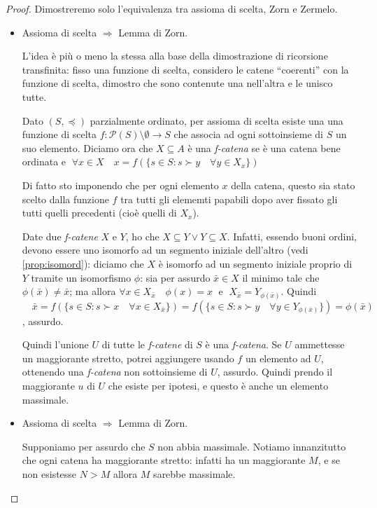 \documentclass[a4paper,10pt,oneside]{article}
\newcommand{\myname}[1]{\emph{#1}}
\theoremstyle{plain}
\theoremstyle{definition}
\theoremstyle{remark}
\begin{document}
\begin{proof}Dimostreremo solo l'equivalenza tra assioma di scelta, Zorn e Zermelo.

\begin{itemize}
 \item Assioma di scelta $\Rightarrow$ Lemma di Zorn.
 
 L'idea è più o meno la stessa alla base della dimostrazione di ricorsione transfinita: fisso una funzione di scelta, considero le catene ``coerenti'' con la funzione di scelta, dimostro che sono contenute una nell'altra e le unisco tutte.
 
 Dato $(S,\preceq)$ parzialmente ordinato, per assioma di scelta esiste una una funzione di scelta $f: \mathcal P (S)\setminus{\emptyset} \rightarrow S$ che associa ad ogni sottoinsieme di $S$ un suo elemento. Diciamo ora che $X\subseteq A$ è una \myname{f-catena} se è una catena bene ordinata e $\; \forall x\in X \quad x=f(\{s\in S: s\succ y \quad \forall y\in X_x\})$
 
 Di fatto sto imponendo che per ogni elemento $x$ della catena, questo sia stato scelto dalla funzione $f$ tra tutti gli elememti papabili dopo aver fissato gli tutti quelli precedenti (cioè quelli di $X_x$).
 
 Date due \myname{f-catene} $X$ e $Y$, ho che $X\subseteq Y \vee Y\subseteq X$. Infatti, essendo buoni ordini, devono essere uno isomorfo ad un segmento iniziale dell'altro (vedi \ref{prop:isomord}): diciamo che $X$ è isomorfo ad un segmento iniziale proprio di $Y$ tramite un isomorfismo $\phi$: sia per assurdo $\bar x\in X$ il minimo tale che $\phi(\bar x)\not = \bar x$; ma allora $\forall x\in X_{\bar x} \quad \phi(x)=x \;$ e $\; X_{\bar x}=Y_{\phi(\bar x)}$. Quindi $\quad\bar x=f(\{s\in S:s\succ x \quad \forall x\in X_{\bar x}\})=f(\{s\in S:s\succ y \quad \forall y\in Y_{\phi(\bar x)}\})=\phi(\bar x)$, assurdo.
 
 Quindi l'unione $U$ di tutte le \myname{f-catene} di $S$ è una \myname{f-catena}. Se $U$ ammettesse un maggiorante stretto, potrei aggiungere usando $f$ un elemento ad $U$, ottenendo una \myname{f-catena} non sottoinsieme di $U$, assurdo. Quindi prendo il maggiorante $u$ di $U$ che esiste per ipotesi, e questo è anche un elemento massimale.
 
 \item Assioma di scelta $\Rightarrow$ Lemma di Zorn.
 
 Supponiamo per assurdo che $S$ non abbia massimale. Notiamo innanzitutto che ogni catena ha maggiorante stretto: infatti ha un maggiorante $M$, e se non esistesse $N>M$ allora $M$ sarebbe massimale.
	

\end{itemize}
\end{proof}
\end{document}

